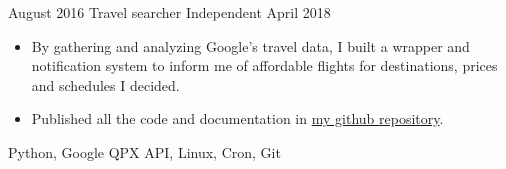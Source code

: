 \begin{projects}
    \emptySeparator

    \project
        {August 2016}
        {Travel searcher}
        {Independent}
        {April 2018}
        {
            \begin{itemize}
                \item By gathering and analyzing Google's travel data, I built 
                    a wrapper and notification system to inform me of 
                    affordable flights for destinations, prices and schedules I 
                    decided.
                \item Published all the code and documentation in 
                    \href{https://github.com/alanverdugo/QPX}{my github 
                    repository}.
            \end{itemize}
        }
        {
            Python,
            Google QPX API,
            Linux,
            Cron,
            Git
        }

\end{projects}

